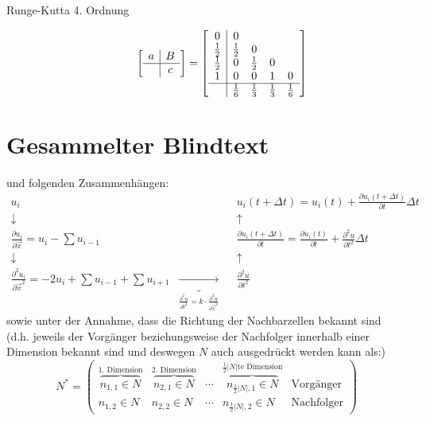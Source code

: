 \documentclass[11pt]{article} %
\theoremstyle{definition}
\begin{document}
\begin{description}
\item[Runge-Kutta 4. Ordnung]
\[
\begin{bmatrix}
\begin{array}{c|c}
a & B\\
\hline     & c \\
\end{array}
\end{bmatrix} = \begin{bmatrix}
\begin{array}{c|cccc}
0 & 0 \\
\frac 1 2 & \frac 1 2 & 0 \\
\frac 1 2 & 0 & \frac 1 2 & 0 \\
1 & 0 & 0 & 1 & 0 \\\hline
& \frac 1 6 & \frac 1 3 & \frac 1 3 & \frac 1 6
\end{array}
\end{bmatrix}
\]
\end{description}

\section{Gesammelter Blindtext}

und folgenden Zusammenhängen:
\begin{align*}
u_i &&& u_i(t+\Delta t) = u_i(t) +  \frac{\partial u_i(t+\Delta t)}{\partial t}\Delta t \\
\downarrow &&& \uparrow \\
\frac{\partial u_i}{\partial \vec x} = u_i - \sum u_{i-1} &&& \frac{\partial u_i(t+\Delta t)}{\partial t} = \frac{\partial u_i(t)}{\partial t} + \frac{\partial^2 u}{\partial t^2}\Delta t \\
\downarrow &&& \uparrow \\
\frac{\partial^2 u_i}{\partial \vec x^2} = -2u_i + \sum u_{i-1} + \sum u_{i+1} & \underbrace{\longrightarrow}_{\frac{\partial^2 u}{\partial t^2} = k\cdot \frac{\partial^2 u}{\partial \vec{x}^2}} && \frac{\partial^2 u}{\partial t^2}
\end{align*}
sowie unter der Annahme, dass die Richtung der Nachbarzellen bekannt sind (d.h. jeweils der Vorgänger beziehungsweise der Nachfolger innerhalb einer Dimension bekannt sind und deswegen $N$ auch ausgedrückt werden kann als:)
\[
N^* =\begin{pmatrix} \overbrace{n_{1,1} \in N}^{\textrm{1. Dimension}} & \overbrace{n_{2,1} \in N}^{\textrm{2. Dimension}} & \cdots & \overbrace{n_{\frac{1}{2}|N|, 1} \in N}^{\textrm{$\frac{1}{2}|N|$te Dimension}} & \textrm{Vorgänger} \\
n_{1,2} \in N & n_{2,2} \in N & \cdots & n_{\frac{1}{2}|N|, 2} \in N & \textrm{Nachfolger}
 \end{pmatrix}
\]
\end{document}
